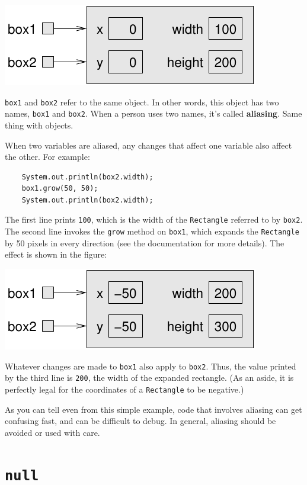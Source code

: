 \documentclass[12pt]{book}
\theoremstyle{exercise}
\begin{document}
\includegraphics{figs/aliasing.pdf}


{\tt box1} and {\tt box2} refer to the same object.
In other words, this object has two names, {\tt box1} and {\tt box2}.
When a person uses two names, it's called {\bf aliasing}.  Same thing
with objects.

When two variables are aliased, any changes that affect one
variable also affect the other.  For example:

\begin{lstlisting}
    System.out.println(box2.width);
    box1.grow(50, 50);
    System.out.println(box2.width);
\end{lstlisting}
%
The first line prints {\tt 100}, which is the width of the
{\tt Rectangle} referred to by {\tt box2}.  The second
line invokes the {\tt grow} method on {\tt box1}, which
expands the {\tt Rectangle} by 50 pixels in every direction
(see the documentation for more details).  The effect
is shown in the figure:


\includegraphics{figs/aliasing2.pdf}


Whatever changes are
made to {\tt box1} also apply to {\tt box2}.  Thus, the
value printed by the third line is {\tt 200}, the width of
the expanded rectangle. (As an aside, it is perfectly legal
for the coordinates of a {\tt Rectangle} to be negative.)

As you can tell even from this simple example, code that
involves aliasing can get confusing fast, and can be
difficult to debug.  In general, aliasing should be avoided
or used with care.


\section {{\tt null}}
\end{document}

